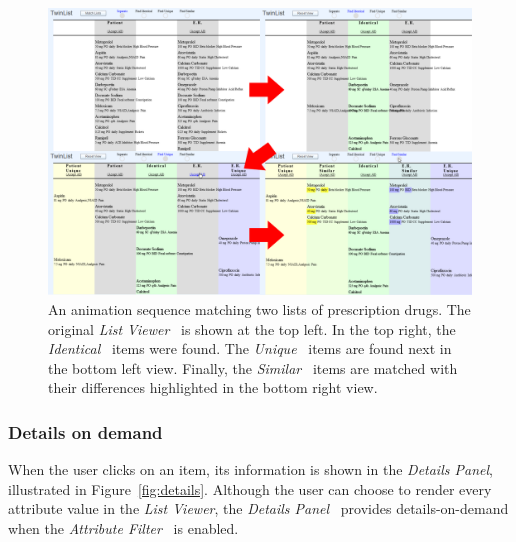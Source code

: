 \documentclass{chi2009}
\newcommand{\ListViewer}{\textit{List Viewer}}
\newcommand{\Details}{\textit{Details Panel}}
\newcommand{\Similar}{\textit{Similar}}
\newcommand{\Identical}{\textit{Identical}}
\newcommand{\Unique}{\textit{Unique}}
\newcommand{\AttributeFilter}{\textit{Attribute Filter}}
\begin{document}
\begin{figure}[t]
\begin{center}
\includegraphics[width=1\linewidth]{img/anim_arrows.png}
\end{center}
   \caption{An animation sequence matching two lists of prescription drugs. The original \ListViewer~ is shown at the top left. In the top right, the \Identical~ items were found. The \Unique~ items are found next in the bottom left view. Finally, the \Similar~ items are matched with their differences highlighted in the bottom right view.}
   \label{fig:animation}
\end{figure}

\subsubsection{Details on demand}
When the user clicks on an item, its information is shown in the \Details, illustrated in Figure~\ref{fig:details}. Although the user can choose to render every attribute value in the \ListViewer, the \Details~ provides details-on-demand when the \AttributeFilter~ is enabled.
\end{document}
